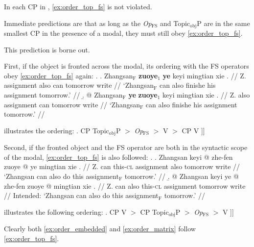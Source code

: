 \documentclass[11pt]{article}
\let\latextextsubscript\textsubscript
\let\textsubscript\latextextsubscript
\newcommand{\gap}[1]{\rule{1em}{0.4pt}\textsubscript{#1}}
\newcommand{\F}{\ensuremath{_{\mathrm{F}}}}
\newcommand{\opfs}{\textit{Op}\(_{\mathrm{FS}}\)}
\newcommand{\topobj}{Topic\(_{\mathrm{obj}}\)P}
\begin{document}
In each CP in \Last, \cref{ex:order_top_fs} is not violated.

Immediate predictions are that as long as the \opfs{} and \topobj{} are in the same smallest CP in the presence of a modal, they must still obey \cref{ex:order_top_fs}.

This prediction is borne out.

First, if the object is fronted across the modal, its ordering with the FS operators obey \cref{ex:order_top_fs} again:
%
\ex.
\a. \begingl
\gla Zhangsan\F{} \textbf{zuoye}\(_1\) \textbf{ye} keyi mingtian xie \nogloss{\gap{1}}. //
  \glb Z. assignment also can tomorrow write //
  \glft `Zhangsan\F{} can also finishe his assignment tomorrow.' //
\endgl
\b. \begingl
\gla \nogloss{\ljudge{*}} @ Zhangsan\F{} \textbf{ye} \textbf{zuoye}\(_1\) keyi mingtian xie \nogloss{\gap{1}}. //
  \glb Z. also assignment can tomorrow write //
  \glft `Zhangsan\F{} can also finishe his assignment tomorrow.' //
\endgl

\Last illustrates the ordering:
\ex. \I{[}CP \topobj{} \(>\) \opfs{} \(>\) V \(>\) \I{[}CP V  ]] \label{ex:order_matrix}

Second, if the fronted object and the FS operator are both in the syntactic scope of the modal, \cref{ex:order_top_fs} is also followed:
\ex.
\a. \begingl
\gla Zhangsan keyi \nogloss{[} @  zhe-fen zuoye @ \nogloss{]\(_{1, \mathrm{F}}\)} ye mingtian xie \nogloss{\gap{1}}. //
  \glb Z. can this-\textsc{cl} assignment also tomorrow write //
  \glft `Zhangsan can also do this assignment\F{} tomorrow.' //
\endgl
\b. \begingl
\gla \nogloss{\ljudge{*}} @ Zhangsan keyi ye \nogloss{[} @  zhe-fen zuoye @ \nogloss{]\(_{1, \mathrm{F}}\)} mingtian xie \nogloss{\gap{1}}. //
  \glb Z. can also this-\textsc{cl} assignment tomorrow write //
  \glft Intended: `Zhangsan can also do this assignment\F{} tomorrow.' //
\endgl

\Last illustrates the following ordering:
\ex. \I{[}CP V \(>\) \I{[}CP \topobj{} \(>\) \opfs{} \(>\) V  ]] \label{ex:order_embedded}

Clearly both \cref{ex:order_embedded} and \cref{ex:order_matrix} follow \cref{ex:order_top_fs}.
\end{document}
